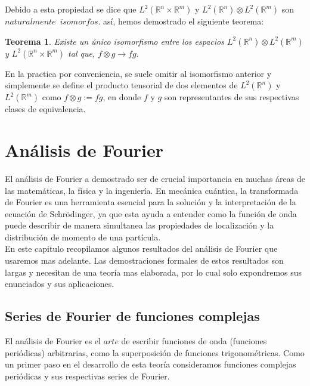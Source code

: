 \documentclass[12pt]{book}
\numberwithin{equation}{chapter}
\newtheorem{theorem}{Teorema}[chapter]
\def\R{\mathbb{R}}
\def\rar{\rightarrow}
\begin{document}
Debido a esta propiedad se dice que $ L^{2}(\R^{n} \times \R^{m}) $ y $L^{2}(\R^{n}) \otimes L^{2}(\R^{m})$ son $naturalmente$ $\,isomorfos$. as\'i, hemos demostrado el siguiente teorema:

\begin{theorem}\label{l2-ten}
Existe un \'unico isomorfismo entre los espacios $ L^{2}(\R^{n}) \otimes L^{2}(\R^{m}) $ y $ L^{2}(\R^{n} \times \R^{m}) $ tal que, $ f \otimes g \rar fg $.
\end{theorem}
En la practica por conveniencia, se suele omitir al isomorfismo anterior y simplemente se define el producto tensorial de dos elementos de $L^{2}(\R^{n})$ y $L^{2}(\R^{m})$ como $f\otimes g := fg$, en donde $f$ y $g$ son representantes de sus respectivas clases de equivalencia.


\chapter{An\'alisis de Fourier}

El an\'alisis de Fourier a demostrado ser de crucial importancia en muchas \'areas de las matem\'aticas, la f\'isica y la ingenier\'ia. En mec\'anica cu\'antica, la transformada de Fourier es una herramienta esencial para la soluci\'on y la interpretaci\'on de la ecuaci\'on de Schr\"odinger, ya que esta ayuda a entender como la funci\'on de onda puede describir de manera simultanea las propiedades de localizaci\'on y la distribuci\'on de momento de una part\'icula.\\

En este capitulo recopilamos algunos resultados del an\'alisis de Fourier que usaremos mas adelante. Las demostraciones formales de estos resultados son largas y necesitan de una teor\'ia mas elaborada, por lo cual solo expondremos sus enunciados y sus aplicaciones.

\section{Series de Fourier de funciones complejas}
El an\'alisis de Fourier es el $arte$ de escribir funciones de onda (funciones peri\'odicas) arbitrarias, como la superposici\'on de funciones trigonom\'etricas. Como un primer paso en el desarrollo de esta teor\'ia consideramos funciones complejas peri\'odicas y sus respectivas series de Fourier.\\
\end{document}
